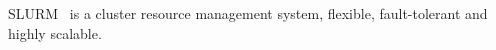 \documentclass[conference,10pt]{IEEEtran}
\begin{document}
SLURM~\cite{SLURM} is a cluster resource management system, flexible, fault-tolerant and highly scalable.

\end{document}
